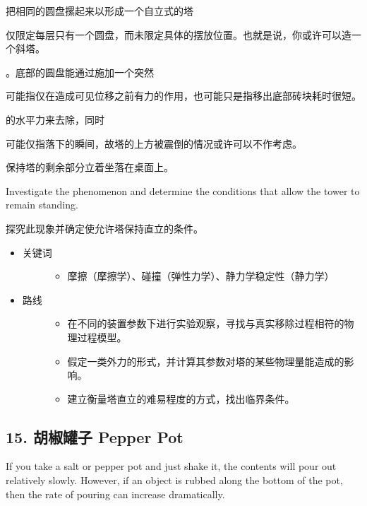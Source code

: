 \documentclass[a4paper,10pt,english]{sphinxmanual}
\begin{document}
把相同的圆盘摞起来以形成一个自立式的塔 %
\begin{footnote}[8]\sphinxAtStartFootnote
仅限定每层只有一个圆盘，而未限定具体的摆放位置。也就是说，你或许可以造一个斜塔。
%
\end{footnote} 。底部的圆盘能通过施加一个突然 %
\begin{footnote}[9]\sphinxAtStartFootnote
可能指仅在造成可见位移之前有力的作用，也可能只是指移出底部砖块耗时很短。
%
\end{footnote} 的水平力来去除，同时 %
\begin{footnote}[10]\sphinxAtStartFootnote
可能仅指落下的瞬间，故塔的上方被震倒的情况或许可以不作考虑。
%
\end{footnote} 保持塔的剩余部分立着坐落在桌面上。

Investigate the phenomenon and determine the conditions that allow the tower to remain standing.

探究此现象并确定使允许塔保持直立的条件。
\begin{itemize}
\item {} \begin{description}
\item[{关键词}] \leavevmode\begin{itemize}
\item {} 
摩擦（摩擦学）、碰撞（弹性力学）、静力学稳定性（静力学）

\end{itemize}

\end{description}

\item {} \begin{description}
\item[{路线}] \leavevmode\begin{itemize}
\item {} 
在不同的装置参数下进行实验观察，寻找与真实移除过程相符的物理过程模型。

\item {} 
假定一类外力的形式，并计算其参数对塔的某些物理量能造成的影响。

\item {} 
建立衡量塔直立的难易程度的方式，找出临界条件。

\end{itemize}

\end{description}

\end{itemize}


\subsection{15. 胡椒罐子 Pepper Pot}
\label{\detokenize{7. Appendix:pepper-pot}}
If you take a salt or pepper pot and just shake it, the contents will pour out relatively slowly. However, if an object is rubbed along the bottom of the pot, then the rate of pouring can increase dramatically.
\end{document}
